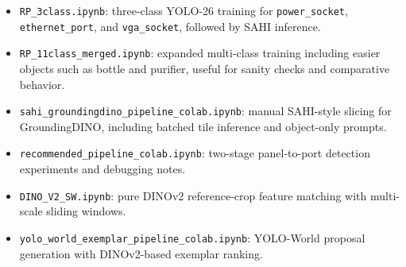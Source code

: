 \documentclass[11pt,a4paper]{article}
\begin{document}
\begin{itemize}[leftmargin=1.5em]
  \item \texttt{RP\_3class.ipynb}: three-class YOLO-26 training for \texttt{power\_socket}, \texttt{ethernet\_port}, and \texttt{vga\_socket}, followed by SAHI inference.
  \item \texttt{RP\_11class\_merged.ipynb}: expanded multi-class training including easier objects such as bottle and purifier, useful for sanity checks and comparative behavior.
  \item \texttt{sahi\_groundingdino\_pipeline\_colab.ipynb}: manual SAHI-style slicing for GroundingDINO, including batched tile inference and object-only prompts.
  \item \texttt{recommended\_pipeline\_colab.ipynb}: two-stage panel-to-port detection experiments and debugging notes.
  \item \texttt{DINO\_V2\_SW.ipynb}: pure DINOv2 reference-crop feature matching with multi-scale sliding windows.
  \item \texttt{yolo\_world\_exemplar\_pipeline\_colab.ipynb}: YOLO-World proposal generation with DINOv2-based exemplar ranking.
\end{itemize}
\end{document}
